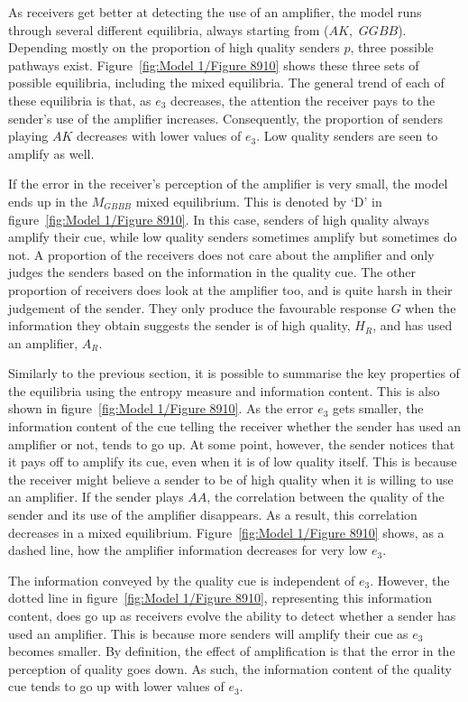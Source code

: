 \documentclass[a4paper,12pt]{article}
\numberwithin{equation}{section}
\begin{document}
As receivers get better at detecting the use of an amplifier, the model runs through several different equilibria, always starting from ($AK$,~$GGBB$). Depending mostly on the proportion of high quality senders $p$, three possible pathways exist. Figure~\ref{fig:Model 1/Figure 8910} shows these three sets of possible equilibria, including the mixed equilibria. The general trend of each of these equilibria is that, as $e_{3}$ decreases, the attention the receiver pays to the sender's use of the amplifier increases. Consequently, the proportion of senders playing $AK$ decreases with lower values of $e_{3}$. Low quality senders are seen to amplify as well.

If the error in the receiver's perception of the amplifier is very small, the model ends up in the $M_{GBBB}$ mixed equilibrium. This is denoted by `D' in figure~\ref{fig:Model 1/Figure 8910}. In this case, senders of high quality always amplify their cue, while low quality senders sometimes amplify but sometimes do not. A proportion of the receivers does not care about the amplifier and only judges the senders based on the information in the quality cue. The other proportion of receivers does look at the amplifier too, and is quite harsh in their judgement of the sender. They only produce the favourable response $G$ when the information they obtain suggests the sender is of high quality, $H_{R}$, and has used an amplifier, $A_{R}$.

Similarly to the previous section, it is possible to summarise the key properties of the equilibria using the entropy measure and information content. This is also shown in figure~\ref{fig:Model 1/Figure 8910}. As the error $e_{3}$ gets smaller, the information content of the cue telling the receiver whether the sender has used an amplifier or not, tends to go up. At some point, however, the sender notices that it pays off to amplify its cue, even when it is of low quality itself. This is because the receiver might believe a sender to be of high quality when it is willing to use an amplifier. If the sender plays $AA$, the correlation between the quality of the sender and its use of the amplifier disappears. As a result, this correlation decreases in a mixed equilibrium. Figure~\ref{fig:Model 1/Figure 8910} shows, as a dashed line, how the amplifier information decreases for very low $e_{3}$.

The information conveyed by the quality cue is independent of $e_{3}$. However, the dotted line in figure~\ref{fig:Model 1/Figure 8910}, representing this information content, does go up as receivers evolve the ability to detect whether a sender has used an amplifier. This is because more senders will amplify their cue as $e_{3}$ becomes smaller. By definition, the effect of amplification is that the error in the perception of quality goes down. As such, the information content of the quality cue tends to go up with lower values of $e_{3}$.
\end{document}
